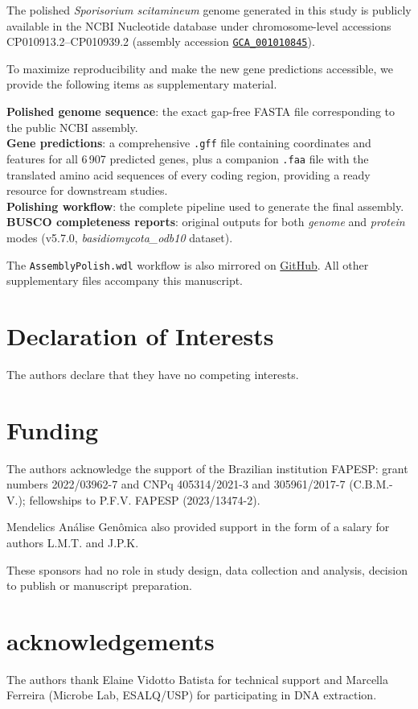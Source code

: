 \documentclass[Journal,letterpaper]{ascelike-new}
\begin{document}
The polished \textit{Sporisorium scitamineum} genome generated in this study is publicly available in the NCBI Nucleotide database under chromosome-level accessions CP010913.2–CP010939.2 (assembly accession \href{https://www.ncbi.nlm.nih.gov/datasets/genome/GCA_001010845}{\texttt{GCA\_001010845}}).

To maximize reproducibility and make the new gene predictions accessible, we provide the following items as supplementary material.

\noindent\textbf{Polished genome sequence}: the exact gap-free FASTA file corresponding to the public NCBI assembly.\\
\textbf{Gene predictions}: a comprehensive \texttt{.gff} file containing coordinates and features for all 6\,907 predicted genes, plus a companion \texttt{.faa} file with the translated amino acid sequences of every coding region, providing a ready resource for downstream studies.\\
\textbf{Polishing workflow}: the complete pipeline used to generate the final assembly.\\
\textbf{BUSCO completeness reports}: original outputs for both \textit{genome} and \textit{protein} modes (v5.7.0, \textit{basidiomycota\_odb10} dataset).

The \texttt{AssemblyPolish.wdl} workflow is also mirrored on \href{https://github.com/lmtani/s-scitamineum-pipelines}{GitHub}. All other supplementary files accompany this manuscript.


\section*{Declaration of Interests}

The authors declare that they have no competing interests.

\section*{Funding}

The authors acknowledge the support of the Brazilian institution FAPESP: grant numbers 2022/03962-7 and CNPq 405314/2021-3 and 305961/2017-7 (C.B.M.-V.); fellowships to P.F.V. FAPESP (2023/13474-2).

Mendelics Análise Genômica also provided support in the form of a salary for authors L.M.T. and J.P.K. 

These sponsors had no role in study design, data collection and analysis, decision to publish or manuscript preparation.

\section*{acknowledgements}

The authors thank Elaine Vidotto Batista for technical support and Marcella Ferreira (Microbe Lab, ESALQ/USP) for participating in DNA extraction.

%
%

%
\end{document}
